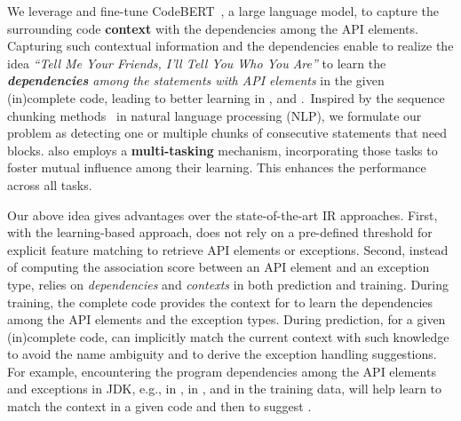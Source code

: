 We leverage and fine-tune CodeBERT~\cite{codebert-emnlp20}, a large
language model, to capture the surrounding code {\bf context} with the
dependencies among the API elements. Capturing such contextual
information and the dependencies enable {\tool} to realize the idea
{\em ``Tell Me Your Friends, I'll Tell You Who You Are''} to learn the
{\em {\bf dependencies} among the statements with API elements} in the
given (in)complete code, leading to better learning in {\xblock},
{\xstate} and {\xtype}.~Inspired by the sequence chunking
methods~\cite{sequence-chunking-aaai17} in natural language
processing (NLP), we formulate our problem as detecting one or
multiple chunks of consecutive statements that need 
blocks. {\tool} also employs a {\bf multi-tasking} mechanism,
incorporating those tasks to foster mutual influence among their
learning. This enhances the performance across all
tasks.



Our above idea gives {\tool} advantages over the state-of-the-art IR
approaches. First, with the learning-based approach, {\tool} does not
rely on a pre-defined threshold for explicit feature matching to
retrieve API elements or exceptions. Second,
instead of computing the association score between an API element and
an exception type,
{\tool} relies on {\em dependencies} and {\em contexts}
in both prediction and training. During training, the complete code
provides the context for {\tool} to learn the dependencies among the
API elements and the exception types. During prediction, for a given
(in)complete code, {\tool} can implicitly match the current context
with such knowledge to avoid the name ambiguity and to derive the
exception handling suggestions.
%
For example, encountering the program dependencies among the API
elements and exceptions in JDK, e.g.,  in
,  in
, and
 in the training data, will help
     {\tool} learn to match the context in a given code and then to suggest
     .

